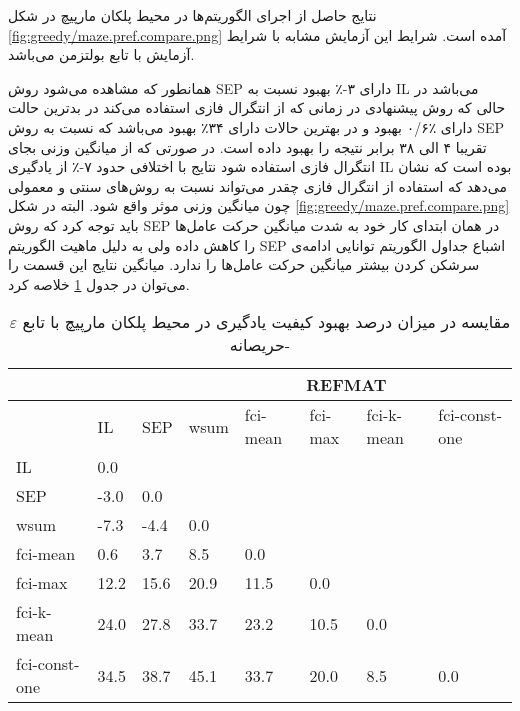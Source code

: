  نتایج حاصل از اجرای الگوریتم‌ها در محیط پلکان مارپیچ در شکل
\ref{fig:greedy/maze.pref.compare.png}
آمده است. شرایط این آزمایش مشابه با شرایط آزمایش با تابع بولتزمن می‌باشد.


همانطور که مشاهده می‌شود روش SEP دارای ۳-٪ بهبود نسبت به IL می‌باشد در حالی که روش پیشنهادی در زمانی که از انتگرال فازی استفاده می‌کند در بدترین حالت دارای ٪۰/۶ بهبود و در بهترین حالات دارای ۳۴٪ بهبود می‌باشد که نسبت به روش SEP تقریبا ۴ الی ۳۸ برابر نتیجه را بهبود داده است. در صورتی که از میانگین وزنی بجای انتگرال فازی استفاده شود نتایج با اختلافی حدود ۷-٪  از یادگیری IL بوده است که نشان ‌می‌دهد که استفاده از انتگرال فازی چقدر می‌تواند نسبت به روش‌های سنتی و معمولی چون میانگین وزنی موثر واقع شود. البته در شکل \ref{fig:greedy/maze.pref.compare.png} باید توجه کرد که روش SEP در همان ابتدای کار خود به شدت میانگین حرکت عامل‌ها را کاهش داده ولی به دلیل ماهیت الگوریتم SEP اشباع جداول الگوریتم توانایی ادامه‌ی سرشکن کردن بیشتر میانگین حرکت عامل‌ها را ندارد. میانگین نتایج این قسمت را می‌توان در جدول
\ref{tab:maze_pref_compare_greedy}
خلاصه کرد.

\begin{table}
\centering
\caption{مقایسه در میزان درصد بهبود کیفیت یادگیری در محیط پلکان مارپیچ با تابع $\varepsilon$-حریصانه}\label{tab:maze_pref_compare_greedy}
\begin{latin}
\begin{tabular}{|*8{l|}}
\hline
\multicolumn{3}{|c|}{}& \multicolumn{5}{c|}{REFMAT}
\\\hline
& IL & SEP & wsum & fci-mean & fci-max & fci-k-mean & fci-const-one
\\\hline
IL &0.0 & & & & & &
\\\hline
SEP &-3.0 &0.0 & & & & &
\\\hline
wsum &-7.3 &-4.4 &0.0 & & & &
\\\hline
fci-mean &0.6 &3.7 &8.5 &0.0 & & &
\\\hline
fci-max &12.2 &15.6 &20.9 &11.5 &0.0 & &
\\\hline
fci-k-mean &24.0 &27.8 &33.7 &23.2 &10.5 &0.0 &
\\\hline
fci-const-one &34.5 &38.7 &45.1 &33.7 &20.0 &8.5 &0.0
\\\hline
\end{tabular}
\end{latin}
\end{table}

